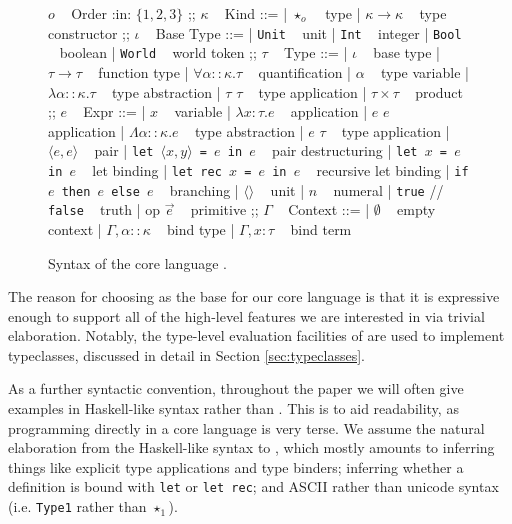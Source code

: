 \documentclass[runningheads]{llncs}
\begin{document}
\begin{figure*}[h]

  \begin{bnf}
    $o$ ~ \textsf{Order} :in: $\{1, 2, 3\}$
    ;;
    $\kappa$ ~ \textsf{Kind} ::=
    | $\star_o$ ~ type
    | $\kappa \rightarrow \kappa$ ~ type constructor
    ;;
    $\iota$ ~ \textsf{Base Type} ::=
    | \texttt{Unit} ~ unit
    | \texttt{Int} ~ integer
    | \texttt{Bool} ~ boolean
    | \texttt{World} ~ world token
    ;;
    $\tau$ ~ \textsf{Type} ::=
    | $\iota$ ~ base type
    | $\tau \rightarrow \tau$ ~ function type
    | $\forall \alpha :: \kappa. \tau$ ~ quantification
    | $\alpha$ ~ type variable
    | $\lambda \alpha :: \kappa. \tau$ ~ type abstraction
    | $\tau$ $\tau$ ~ type application
    | $\tau \times \tau$ ~ product
    ;;
    $e$ ~ \textsf{Expr} ::=
    | $x$ ~ variable
    | $\lambda x : \tau. e$ ~ application
    | $e$ $e$ ~ application
    | $\Lambda \alpha :: \kappa. e$ ~ type abstraction
    | $e$ $\tau$ ~ type application
    | $\langle e , e \rangle$ ~ pair
    | \texttt{let $\langle x , y \rangle$ = $e$ in $e$} ~ pair destructuring
    | \texttt{let $x$ = $e$ in $e$} ~ let binding
    | \texttt{let rec $x$ = $e$ in $e$} ~ recursive let binding
    | \texttt{if $e$ then $e$ else $e$} ~ branching
    | $\langle \rangle$ ~ unit
    | $n$ ~ numeral
    | \texttt{true} // \texttt{false} ~ truth
    | op $\overrightarrow e$ ~ primitive
    ;;
    $\Gamma$ ~ \textsf{Context} ::=
    | $\emptyset$ ~ empty context
    | $\Gamma , \alpha :: \kappa$ ~ bind type
    | $\Gamma , x : \tau$ ~ bind term
  \end{bnf}

  \caption{Syntax of the core language \core{}.}
  \label{fig:core-syntax}
\end{figure*}

The reason for choosing \fom{} as the base for our core language is that it is expressive enough to support all of the high-level features we are interested in via trivial elaboration. Notably, the type-level evaluation facilities of \fom{} are used to implement typeclasses, discussed in detail in Section \ref{sec:typeclasses}.

As a further syntactic convention, throughout the paper we will often give examples in Haskell-like syntax rather than \core{}. This is to aid readability, as programming directly in a core language is very terse. We assume the natural elaboration from the Haskell-like syntax to \core{}, which mostly amounts to inferring things like explicit type applications and type binders; inferring whether a definition is bound with \texttt{let} or \texttt{let rec}; and ASCII rather than unicode syntax (i.e. \texttt{Type1} rather than $\star_1$).
\end{document}
